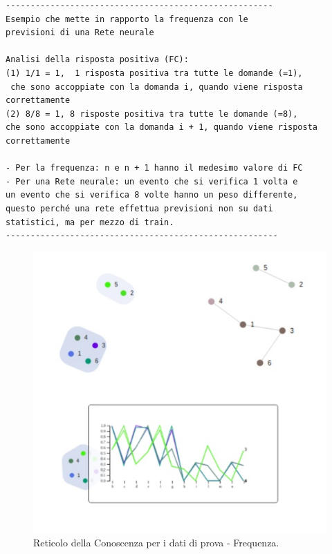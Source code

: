 \begin{verbatim}
------------------------------------------------------
Esempio che mette in rapporto la frequenza con le 
previsioni di una Rete neurale

Analisi della risposta positiva (FC):
(1) 1/1 = 1,  1 risposta positiva tra tutte le domande (=1),
 che sono accoppiate con la domanda i, quando viene risposta
correttamente	
(2) 8/8 = 1, 8 risposte positiva tra tutte le domande (=8),
che sono accoppiate con la domanda i + 1, quando viene risposta
correttamente

- Per la frequenza: n e n + 1 hanno il medesimo valore di FC
- Per una Rete neurale: un evento che si verifica 1 volta e
un evento che si verifica 8 volte hanno un peso differente,
questo perché una rete effettua previsioni non su dati
statistici, ma per mezzo di train.
-------------------------------------------------------
\end{verbatim}


\begin{figure}[H]
\centering
	\includegraphics[width=0.50\linewidth]{./image/collage_reticolo-general-FREQ.png}
	\caption{Reticolo della Conoscenza per i dati di prova - Frequenza.}
	\label{Reticolo della Conoscenza per i dati di prova - Frequenza.}
\end{figure}
\noindent



